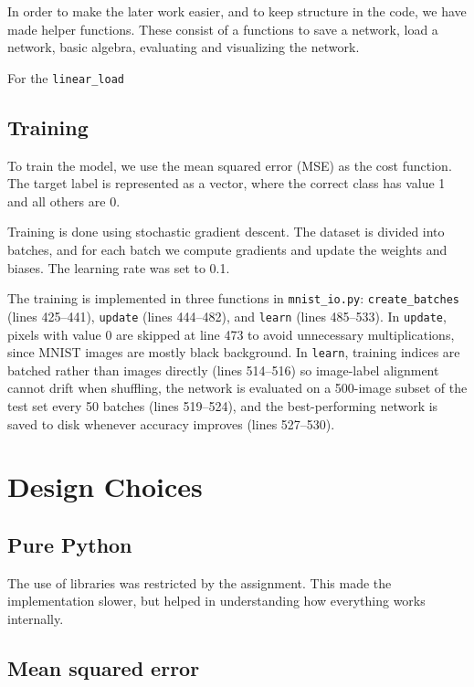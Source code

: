 \documentclass[a4paper, 11pt]{report}
\begin{document}
In order to make the later work easier, and to keep structure in the code, we have made helper functions. These consist of a functions to save a network, load a network, basic algebra, evaluating and visualizing the network.

For the \texttt{linear_load} 

\subsection*{Training}

To train the model, we use the mean squared error (MSE) as the cost function. The target label is represented as a vector, where the correct class has value 1 and all others are 0.

Training is done using stochastic gradient descent. The dataset is divided into batches, and for each batch we compute gradients and update the weights and biases. The learning rate was set to 0.1.

The training is implemented in three functions in \texttt{mnist\_io.py}: \texttt{create\_batches} (lines 425--441), \texttt{update} (lines 444--482), and \texttt{learn} (lines 485--533). In \texttt{update}, pixels with value 0 are skipped at line 473 to avoid unnecessary multiplications, since MNIST images are mostly black background. In \texttt{learn}, training indices are batched rather than images directly (lines 514--516) so image-label alignment cannot drift when shuffling, the network is evaluated on a 500-image subset of the test set every 50 batches (lines 519--524), and the best-performing network is saved to disk whenever accuracy improves (lines 527--530).


\vspace{20pt}
\section*{Design Choices}

\subsection*{Pure Python} 

The use of libraries was restricted by the assignment. This made the implementation slower, but helped in understanding how everything works internally.
    
\subsection*{Mean squared error} 
\end{document}
